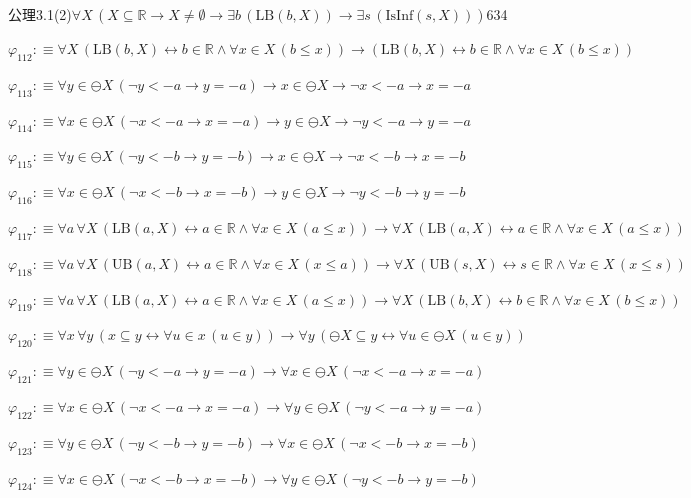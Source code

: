 \begin{fullproof}{公理3.1(2)}{$\forall X\,(X \subseteq \mathbb{R} \to X \neq \emptyset \to \exists b\,(\mathrm{LB}(b,X)) \to \exists s\,(\mathrm{IsInf}(s,X)))$}{634}
\begin{abbrevlist}
\item $\varphi_{112} :\equiv \forall X\,(\mathrm{LB}(b,X) \leftrightarrow b \in \mathbb{R} \land \forall x \in X\,(b \leq x)) \to (\mathrm{LB}(b,X) \leftrightarrow b \in \mathbb{R} \land \forall x \in X\,(b \leq x))$
\item $\varphi_{113} :\equiv \forall y \in \ominus X\,(\neg y < -a \to y = -a) \to x \in \ominus X \to \neg x < -a \to x = -a$
\item $\varphi_{114} :\equiv \forall x \in \ominus X\,(\neg x < -a \to x = -a) \to y \in \ominus X \to \neg y < -a \to y = -a$
\item $\varphi_{115} :\equiv \forall y \in \ominus X\,(\neg y < -b \to y = -b) \to x \in \ominus X \to \neg x < -b \to x = -b$
\item $\varphi_{116} :\equiv \forall x \in \ominus X\,(\neg x < -b \to x = -b) \to y \in \ominus X \to \neg y < -b \to y = -b$
\item $\varphi_{117} :\equiv \forall a\,\forall X\,(\mathrm{LB}(a,X) \leftrightarrow a \in \mathbb{R} \land \forall x \in X\,(a \leq x)) \to \forall X\,(\mathrm{LB}(a,X) \leftrightarrow a \in \mathbb{R} \land \forall x \in X\,(a \leq x))$
\item $\varphi_{118} :\equiv \forall a\,\forall X\,(\mathrm{UB}(a,X) \leftrightarrow a \in \mathbb{R} \land \forall x \in X\,(x \leq a)) \to \forall X\,(\mathrm{UB}(s,X) \leftrightarrow s \in \mathbb{R} \land \forall x \in X\,(x \leq s))$
\item $\varphi_{119} :\equiv \forall a\,\forall X\,(\mathrm{LB}(a,X) \leftrightarrow a \in \mathbb{R} \land \forall x \in X\,(a \leq x)) \to \forall X\,(\mathrm{LB}(b,X) \leftrightarrow b \in \mathbb{R} \land \forall x \in X\,(b \leq x))$
\item $\varphi_{120} :\equiv \forall x\,\forall y\,(x \subseteq y \leftrightarrow \forall u \in x\,(u \in y)) \to \forall y\,(\ominus X \subseteq y \leftrightarrow \forall u \in \ominus X\,(u \in y))$
\item $\varphi_{121} :\equiv \forall y \in \ominus X\,(\neg y < -a \to y = -a) \to \forall x \in \ominus X\,(\neg x < -a \to x = -a)$
\item $\varphi_{122} :\equiv \forall x \in \ominus X\,(\neg x < -a \to x = -a) \to \forall y \in \ominus X\,(\neg y < -a \to y = -a)$
\item $\varphi_{123} :\equiv \forall y \in \ominus X\,(\neg y < -b \to y = -b) \to \forall x \in \ominus X\,(\neg x < -b \to x = -b)$
\item $\varphi_{124} :\equiv \forall x \in \ominus X\,(\neg x < -b \to x = -b) \to \forall y \in \ominus X\,(\neg y < -b \to y = -b)$

\end{abbrevlist}
\end{fullproof}
